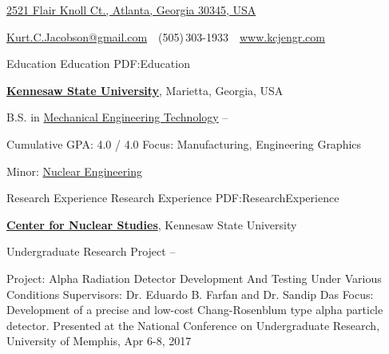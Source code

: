 \documentclass[
letterpaper,
MMMyyyy,
nonstopmode,
draftmode,
]{resume}
\makeatletter
\newcommand{\CVAuthor}{Kurt C. Jacobson}
\newcommand{\CVWebpage}{www.kcjengr.com}
\newcommand{\CVEmail}{Kurt.C.Jacobson@gmail.com}
\makeatother
\begin{document}

\Title{\CVAuthor}

\begin{SubTitle}
\href{https://www.google.com/maps/place/2521+Flair+Knoll+Ct+NE,+Atlanta,+GA+30345}
{2521 Flair Knoll Ct., Atlanta, Georgia 30345, USA}
\par
\href{mailto:\CVEmail}
{\CVEmail}
\,\SubBulletSymbol\,
(505)\,303-1933
\,\SubBulletSymbol\,
\href{\CVWebpage}
{\url{\CVWebpage}}
\end{SubTitle}

\begin{Body}


\Section
{Education}
{Education}
{PDF:Education}

\Entry
\href{http://www.kennesaw.edu/}
{\textbf{Kennesaw State University}},
Marietta, Georgia, USA

\Gap
\BulletItem
B.S. in
\href{http://engineering.kennesaw.edu/engineering-technology/}
{Mechanical Engineering Technology}
\hfill
{} --
\begin{Detail}
\SubBulletItem
Cumulative GPA: 4.0 / 4.0
\SubBulletItem
Focus:
Manufacturing, Engineering Graphics

\SubBulletItem
Minor:
\href{http://engineering.kennesaw.edu/nuclear-studies/}
{Nuclear Engineering}
\end{Detail}



\Section
{Research Experience}
{Research Experience}
{PDF:ResearchExperience}

\Entry
\href{http://engineering.kennesaw.edu/nuclear-studies/}
{\textbf{Center for Nuclear Studies}},
Kennesaw State University

\Gap
\BulletItem
Undergraduate Research Project
\hfill
{} --
\begin{Detail}
\SubBulletItem
Project:
Alpha Radiation Detector Development And Testing Under Various Conditions
\SubBulletItem
Supervisors:
Dr. Eduardo B. Farfan and
Dr. Sandip Das
\SubBulletItem
Focus:
Development of a precise and low-cost Chang-Rosenblum type alpha particle detector.
\SubBulletItem
Presented at the National Conference on Undergraduate Research, University of Memphis, Apr 6-8, 2017
\end{Detail}



\end{Body}
\end{document}
